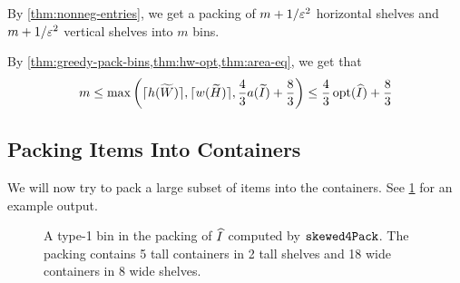 By \cref{thm:nonneg-entries}, we get a packing of $m+1/\varepsilon^2$ horizontal shelves
and $m+1/\varepsilon^2$ vertical shelves into $m$ bins.

By \cref{thm:greedy-pack-bins,thm:hw-opt,thm:area-eq}, we get that
\[ m \le \max\left(\lceil h(\widetilde{W}) \rceil, \lceil w(\widetilde{H}) \rceil,
    \frac{4}{3}a(\widetilde{I}) + \frac{8}{3}\right)
\le \frac{4}{3}\operatorname{opt}(\widehat{I}) + \frac{8}{3} \]

\subsection{Packing Items Into Containers}
\label{sec:bp-algo:pack-into-containers}

We will now try to pack a large subset of items into the containers.
See \cref{fig:thin-gpack-output} for an example output.

\begin{figure}[htb]
\centering

\caption[A type-1 bin in the packing of $\Ihat$ computed by $\thinGPack$.]%
{A type-1 bin in the packing of $\Ihat$ computed by $\thinGPack$.
The packing contains 5 tall containers in 2 tall shelves
and 18 wide containers in 8 wide shelves.}
\label{fig:thin-gpack-output}
\end{figure}

